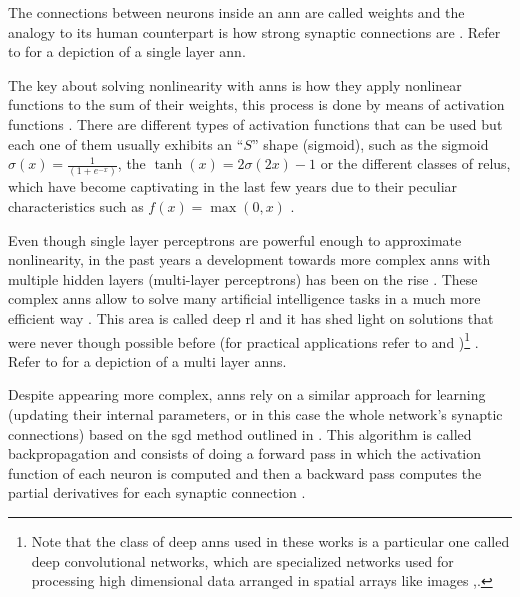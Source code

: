 \documentclass[draft=false]{seal_thesis}
\begin{document}
The connections between neurons inside an \gls{ann} are called weights and the analogy to its human counterpart is how strong synaptic connections are \citep[p. 216]{Sutton2017}. Refer to  for a depiction of a single layer \gls{ann}.

The key about solving nonlinearity with \glspl{ann} is how they apply nonlinear functions to the sum of their weights, this process is done by means of activation functions \citep[p. 216]{Sutton2017}. There are different types of activation functions that can be used but each one of them usually exhibits an ``$S$'' shape (\ie sigmoid), such as the sigmoid $\sigma(x) = \frac{1}{(1+e^{-x})}$, the $\tanh(x) = 2\sigma(2x)-1$ or the different classes of \glspl{relu}, which have become captivating in the last few years due to their peculiar characteristics such as $f(x) = \max(0,x)$ \citep[p. 216]{Sutton2017}.


Even though single layer perceptrons are powerful enough to approximate nonlinearity, in the past years a development towards more complex \glspl{ann} with multiple hidden layers (\ie multi-layer perceptrons) has been on the rise \citep[p. 217]{Sutton2017}. These complex \glspl{ann} allow to solve many artificial intelligence tasks in a much more efficient way \citep{Bengio2009}. This area is called deep \gls{rl} and it has shed light on solutions that were never though possible before (for practical applications refer to \citet{Mnih2015} and \citet{Silver2016})\footnote{Note that the class of deep \glspl{ann} used in these works is a particular one called deep convolutional networks, which are specialized networks used for processing high dimensional data arranged in spatial arrays like images \citep[p. 219]{Sutton2017},\citep{Lecun1998}.} \citep{Bengio2009}. Refer to  for a depiction of a multi layer \glspl{ann}.


Despite appearing more complex, \glspl{ann} rely on a similar approach for learning (\ie updating their internal parameters, or in this case the whole network's synaptic connections) based on the \gls{sgd} method outlined in  \citep[p. 217]{Sutton2017}. This algorithm is called backpropagation and consists of doing a forward pass in which the activation function of each neuron is computed and then a backward pass computes the partial derivatives for each synaptic connection \citep[p. 218]{Sutton2017}.
\end{document}
